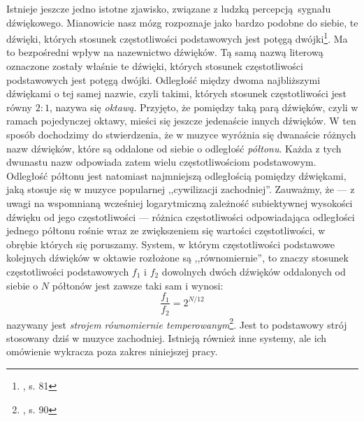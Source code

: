 Istnieje jeszcze jedno istotne zjawisko, związane z ludzką percepcją sygnału dźwiękowego. Mianowicie nasz mózg rozpoznaje jako bardzo podobne do siebie, te dźwięki, których stosunek częstotliwości podstawowych jest potęgą dwójki\footnote{\cite{lerch_introduction_2012}, s. 81}. Ma to bezpośredni wpływ na nazewnictwo dźwięków. Tą samą nazwą literową oznaczone zostały właśnie te dźwięki, których stosunek częstotliwości podstawowych jest potęgą dwójki. Odległość między dwoma najbliższymi dźwiękami o tej samej nazwie, czyli takimi, których stosunek częstotliwości jest równy $2:1$, nazywa się \emph{oktawą}. Przyjęto, że pomiędzy taką parą dźwięków, czyli w ramach pojedynczej oktawy, mieści się jeszcze jedenaście innych dźwięków. W ten sposób dochodzimy do stwierdzenia, że w muzyce wyróżnia się dwanaście różnych nazw dźwięków, które są oddalone od siebie o odległość \emph{półtonu}. Każda z tych dwunastu nazw odpowiada zatem wielu częstotliwościom podstawowym. Odległość półtonu jest natomiast najmniejszą odległością pomiędzy dźwiękami, jaką stosuje się w muzyce popularnej ,,cywilizacji zachodniej''. Zauważmy, że --- z uwagi na wspomnianą wcześniej logarytmiczną zależność subiektywnej wysokości dźwięku od jego częstotliwości --- różnica częstotliwości odpowiadająca odległości jednego półtonu rośnie wraz ze zwiększeniem się wartości częstotliwości, w obrębie których się poruszamy. System, w którym częstotliwości podstawowe kolejnych dźwięków w oktawie rozłożone są ,,równomiernie'', to znaczy stosunek częstotliwości podstawowych $f_1$ i $f_2$ dowolnych dwóch dźwięków oddalonych od siebie o $N$ półtonów jest zawsze taki sam i wynosi:
\begin{equation} \label{eq:stroj_rownomiernie_temperowany}
    \frac{f_1}{f_2} = 2^{N/12}
\end{equation}
nazywany jest \emph{strojem równomiernie temperowanym}\footnote{\cite{lerch_introduction_2012}, s. 90}. Jest to podstawowy strój stosowany dziś w muzyce zachodniej. Istnieją również inne systemy, ale ich omówienie wykracza poza zakres niniejszej pracy.


